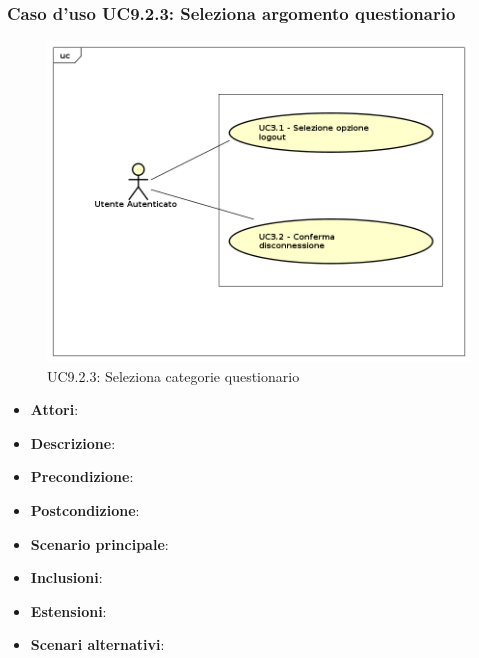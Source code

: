 		\subsubsection{Caso d'uso UC9.2.3: Seleziona argomento questionario}
		\label{UC9.2.3}
		\begin{figure}[h]
			\centering
		\includegraphics[scale=0.7,keepaspectratio]{UML/UC9.png}
			\caption{UC9.2.3: Seleziona categorie questionario}
		\end{figure}
		\FloatBarrier
		\begin{itemize}
			\item \textbf{Attori}: 
			\item \textbf{Descrizione}: 
			\item \textbf{Precondizione}: 
			\item \textbf{Postcondizione}: 
			\item \textbf{Scenario principale}:
			\item \textbf{Inclusioni}:
			\item \textbf{Estensioni}:
			\item \textbf{Scenari alternativi}:
		\end{itemize}
		
